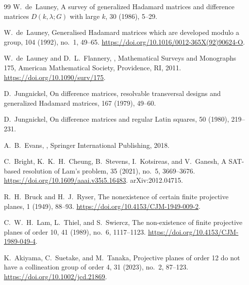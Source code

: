 \documentclass[11pt]{article}
\begin{document}
\begin{thebibliography}{99}
W.~de~Launey,
\newblock A survey of generalized Hadamard matrices and difference matrices
  \(D(k,\lambda;G)\) with large \(k\),
 30 (1986), 5--29.

W.~de~Launey,
\newblock Generalised Hadamard matrices which are developed modulo a group,
 104 (1992), no.~1, 49--65.
\newblock \url{https://doi.org/10.1016/0012-365X(92)90624-O}.

W.~de~Launey and D.~L.~Flannery,
,
\newblock Mathematical Surveys and Monographs 175, American Mathematical
  Society, Providence, RI, 2011.
\newblock \url{https://doi.org/10.1090/surv/175}.

D.~Jungnickel,
\newblock On difference matrices, resolvable transversal designs and
  generalized Hadamard matrices,
 167 (1979), 49--60.

D.~Jungnickel,
\newblock On difference matrices and regular Latin squares,
 50 (1980), 219--231.

A.~B.~Evans,
,
\newblock Springer International Publishing, 2018.

C.~Bright, K.~K.~H.~Cheung, B.~Stevens, I.~Kotsireas, and V.~Ganesh,
\newblock A SAT-based resolution of Lam's problem,
 35 (2021),
  no.\ 5, 3669--3676.
\newblock \url{https://doi.org/10.1609/aaai.v35i5.16483}.
\newblock arXiv:2012.04715.

R.~H.~Bruck and H.~J.~Ryser,
\newblock The nonexistence of certain finite projective planes,
 1 (1949), 88--93.
\newblock \url{https://doi.org/10.4153/CJM-1949-009-2}.

C.~W.~H.~Lam, L.~Thiel, and S.~Swiercz,
\newblock The non-existence of finite projective planes of order 10,
 41 (1989), no.\ 6, 1117--1123.
\newblock \url{https://doi.org/10.4153/CJM-1989-049-4}.

K.~Akiyama, C.~Suetake, and M.~Tanaka,
\newblock Projective planes of order 12 do not have a collineation group of
  order 4,
 31 (2023), no.\ 2, 87--123.
\newblock \url{https://doi.org/10.1002/jcd.21869}.


\end{thebibliography}
\end{document}
